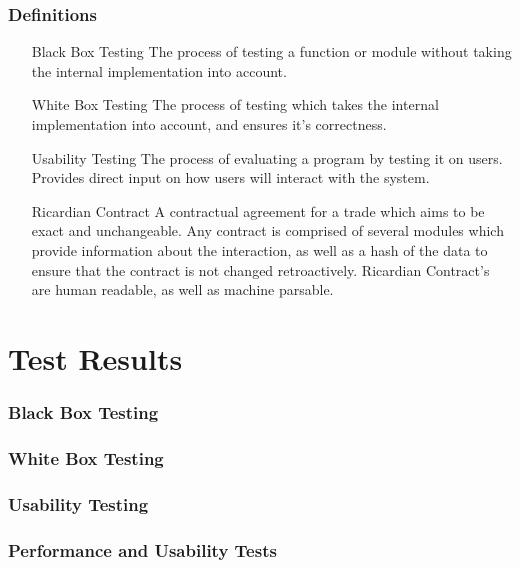 \documentclass{article}
\begin{document}
\section{Definitions}
\begin{itemize}
\item[Black Box Testing]
The process of testing a function or module without taking the internal implementation into account.

\item[White Box Testing]
The process of testing which takes the internal implementation into account, and ensures it's correctness.

\item[Usability Testing]
The process of evaluating a program by testing it on users. Provides direct input on how users will interact with the system.

\item[Ricardian Contract]
A contractual agreement for a trade which aims to be exact and unchangeable. Any contract is comprised of several modules which provide information about the interaction, as well as a hash of the data to ensure that the contract is not changed retroactively. Ricardian Contract's are human readable, as well as machine parsable. 
\end{itemize}

\part*{Test Results}
\section{Black Box Testing}

\section{White Box Testing}

\section{Usability Testing}

\section{Performance and Usability Tests}
\end{document}
